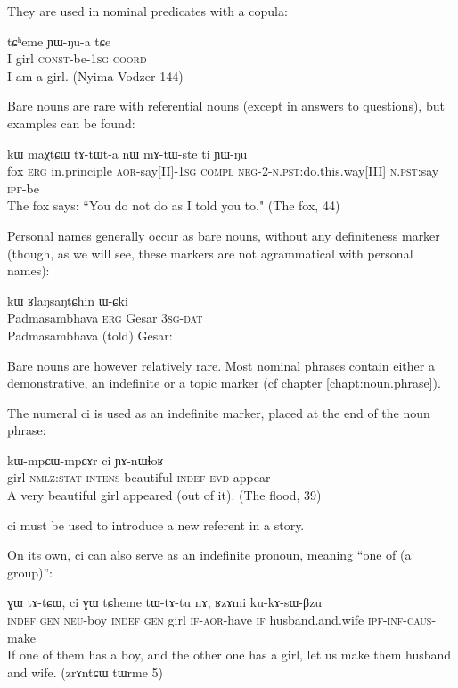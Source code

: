 \documentclass[oldfontcommands,oneside,a4paper,11pt]{memoir}
\newcommand{\ipa}[1]{{\phon #1}} %
\newcommand{\aor}{\textsc{aor}}
\newcommand{\caus}{\textsc{caus}}
\newcommand{\compl}{\textsc{compl}} %
\newcommand{\coord}{\textsc{coord}}
\newcommand{\const}{\textsc{const}}
\newcommand{\erg}{\textsc{erg}}
\newcommand{\evd}{\textsc{evd}}
\newcommand{\gen}{\textsc{gen}}
\newcommand{\inftv}{\textsc{inf}}
\newcommand{\ipf}{\textsc{ipf}}
\newcommand{\negat}{\textsc{neg}}
\newcommand{\neu}{\textsc{neu}}
\newcommand{\nmlz}{\textsc{nmlz}}
\newcommand{\npst}{\textsc{n.pst}}
\newcommand{\sg}{\textsc{sg}}
\newcommand{\stat}{\textsc{stat}}
\begin{document}
They are  used in nominal predicates with a copula:

  \begin{exe}
\ex
\gll \ipa{aʑo} 	\ipa{tɕʰeme} 	\ipa{ɲɯ-ŋu-a}  \ipa{tɕe} \\
I girl \const{}-be-1\sg{} \coord{} \\
\glt I am a girl. (Nyima Vodzer 144)
\end{exe}

Bare nouns are rare with referential nouns (except in answers to questions), but examples can be found:

  \begin{exe}
\ex
\gll \ipa{qacʰɣa} 	\ipa{kɯ} 	\ipa{maχtɕɯ} \ipa{tɤ-tɯt-a} \ipa{nɯ} \ipa{mɤ-tɯ-ste} 	\ipa{ti} 	\ipa{ɲɯ-ŋu}  \\
fox \erg{} in.principle \aor{}-say[II]-1\sg{} \compl{} \negat{}-2-\npst{}:do.this.way[III] \npst{}:say \ipf{}-be \\
\glt The fox says: ``You do not do as I told you to." (The fox, 44)
\end{exe}

Personal names generally occur as bare nouns, without any definiteness marker (though, as we will see, these markers are not agrammatical with personal names):

  \begin{exe}
\ex
\gll  \ipa{ɯrɟɤnpanma} 	\ipa{kɯ} 	\ipa{ʁlaŋsaŋtɕhin} 	\ipa{ɯ-ɕki}  \\
 Padmasambhava \erg{} Gesar 3\sg{}-\textsc{dat} \\
\glt Padmasambhava (told) Gesar:
\end{exe}

Bare nouns are however relatively rare. Most nominal phrases contain either a demonstrative, an indefinite or a topic marker (cf chapter \ref{chapt:noun.phrase}). 


The numeral \ipa{ci} is used as an indefinite marker, placed at the end of the noun phrase:
  \begin{exe}
\ex
\gll \ipa{tɕʰeme} 	\ipa{kɯ-mpɕɯ-mpɕɤr} 	\ipa{ci} 	\ipa{ɲɤ-nɯɬoʁ} \\
girl \nmlz{}:\stat{}-\textsc{intens}-beautiful \textsc{indef}  \evd{}-appear \\
\glt A very beautiful girl appeared (out of it). (The flood, 39)
\end{exe}
\ipa{ci} must be used to introduce a new referent in a story.

On its own, \ipa{ci} can also serve as an indefinite pronoun, meaning ``one of (a group)'':
  \begin{exe}
\ex
\gll \ipa{ci} 	\ipa{ɣɯ} 	\ipa{tɤ-tɕɯ,} 	\ipa{ci} 	\ipa{ɣɯ} 	\ipa{tɕheme} 	\ipa{tɯ-tɤ-tu} 	\ipa{nɤ,} 	\ipa{ʁzɤmi} 	\ipa{ku-kɤ-sɯ-βzu} \\
\textsc{indef} \gen{} \neu{}-boy \textsc{indef} \gen{} girl \textsc{if}-\aor{}-have \textsc{if} husband.and.wife \ipf{}-\inftv{}-\caus{}-make \\
\glt If one of them has a boy, and the other one has a girl, let us make them husband and wife. (zrɤntɕɯ tɯrme 5)
\end{exe}
\end{document}

